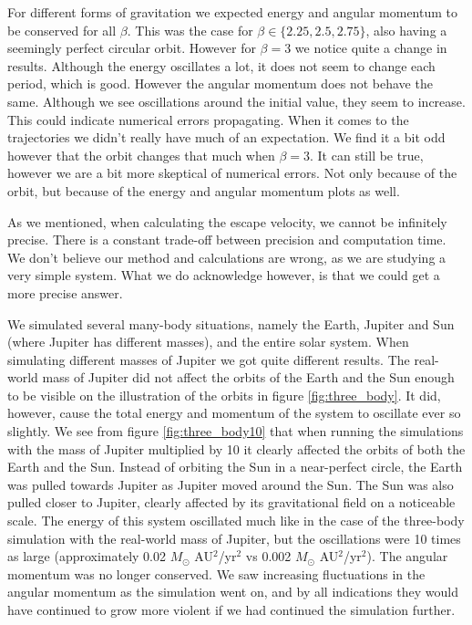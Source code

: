 \documentclass[reprint, english,notitlepage,nofootinbib]{revtex4-1}  %
\begin{document}
For different forms of gravitation we expected energy and angular momentum to be conserved for all $\beta$. This was the case for $\beta \in \{2.25,2.5,2.75\}$, also having a seemingly perfect circular orbit. However for $\beta = 3$ we notice quite a change in results. Although the energy oscillates a lot, it does not seem to change each period, which is good. However the angular momentum does not behave the same. Although we see oscillations around the initial value, they seem to increase. This could indicate numerical errors propagating. When it comes to the trajectories we didn't really have much of an expectation. We find it a bit odd however that the orbit changes that much when $\beta = 3$. It can still be true, however we are a bit more skeptical of numerical errors. Not only because of the orbit, but because of the energy and angular momentum plots as well.

As we mentioned, when calculating the escape velocity, we cannot be infinitely precise. There is a constant trade-off between precision and computation time. We don't believe our method and calculations are wrong, as we are studying a very simple system. What we do acknowledge however, is that we could get a more precise answer.

We simulated several many-body situations, namely the Earth, Jupiter and Sun (where Jupiter has different masses), and the entire solar system. When simulating different masses of Jupiter we got quite different results. The real-world mass of Jupiter did not affect the orbits of the Earth and the Sun enough to be visible on the illustration of the orbits in figure \ref{fig:three_body}. It did, however, cause the total energy and momentum of the system to oscillate ever so slightly. We see from figure \ref{fig:three_body10} that when running the simulations with the mass of Jupiter multiplied by 10 it clearly affected the orbits of both the Earth and the Sun. Instead of orbiting the Sun in a near-perfect circle, the Earth was pulled towards Jupiter as Jupiter moved around the Sun. The Sun was also pulled closer to Jupiter, clearly affected by its gravitational field on a noticeable scale. The energy of this system oscillated much like in the case of the three-body simulation with the real-world mass of Jupiter, but the oscillations were 10 times as large (approximately 0.02 $M_\odot$ AU$^2$/yr$^2$ vs 0.002 $M_\odot$ AU$^2$/yr$^2$). The angular momentum was no longer conserved. We saw increasing fluctuations in the angular momentum as the simulation went on, and by all indications they would have continued to grow more violent if we had continued the simulation further.
\end{document}
